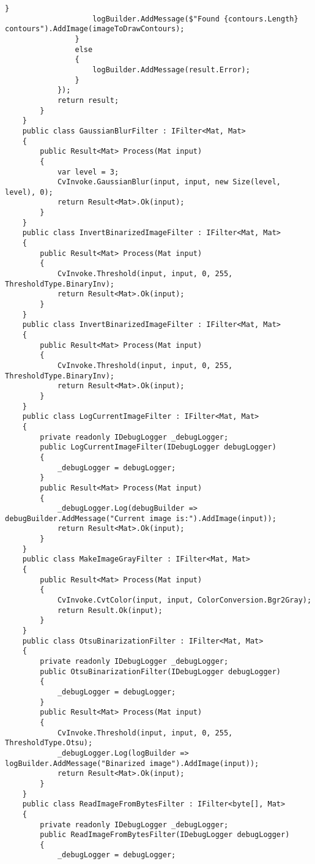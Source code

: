 \begin{lstlisting}[style=fsharpstyle,caption={Исходный код}, label=lst:recognition_result_handler]
                    }
                    logBuilder.AddMessage($"Found {contours.Length} contours").AddImage(imageToDrawContours);
                }
                else
                {
                    logBuilder.AddMessage(result.Error);
                }
            });
            return result;
        }
    }
    public class GaussianBlurFilter : IFilter<Mat, Mat>
    {
        public Result<Mat> Process(Mat input)
        {
            var level = 3;
            CvInvoke.GaussianBlur(input, input, new Size(level, level), 0);
            return Result<Mat>.Ok(input);
        }
    }
    public class InvertBinarizedImageFilter : IFilter<Mat, Mat>
    {
        public Result<Mat> Process(Mat input)
        {
            CvInvoke.Threshold(input, input, 0, 255, ThresholdType.BinaryInv);
            return Result<Mat>.Ok(input);
        }
    }
    public class InvertBinarizedImageFilter : IFilter<Mat, Mat>
    {
        public Result<Mat> Process(Mat input)
        {
            CvInvoke.Threshold(input, input, 0, 255, ThresholdType.BinaryInv);
            return Result<Mat>.Ok(input);
        }
    }
    public class LogCurrentImageFilter : IFilter<Mat, Mat>
    {
        private readonly IDebugLogger _debugLogger;
        public LogCurrentImageFilter(IDebugLogger debugLogger)
        {
            _debugLogger = debugLogger;
        }
        public Result<Mat> Process(Mat input)
        {
            _debugLogger.Log(debugBuilder => debugBuilder.AddMessage("Current image is:").AddImage(input));
            return Result<Mat>.Ok(input);
        }
    }
    public class MakeImageGrayFilter : IFilter<Mat, Mat>
    {
        public Result<Mat> Process(Mat input)
        {
            CvInvoke.CvtColor(input, input, ColorConversion.Bgr2Gray);
            return Result.Ok(input);
        }
    }
    public class OtsuBinarizationFilter : IFilter<Mat, Mat>
    {
        private readonly IDebugLogger _debugLogger;
        public OtsuBinarizationFilter(IDebugLogger debugLogger)
        {
            _debugLogger = debugLogger;
        }
        public Result<Mat> Process(Mat input)
        {
            CvInvoke.Threshold(input, input, 0, 255, ThresholdType.Otsu);
            _debugLogger.Log(logBuilder => logBuilder.AddMessage("Binarized image").AddImage(input));
            return Result<Mat>.Ok(input);
        }
    }
    public class ReadImageFromBytesFilter : IFilter<byte[], Mat>
    {
        private readonly IDebugLogger _debugLogger;
        public ReadImageFromBytesFilter(IDebugLogger debugLogger)
        {
            _debugLogger = debugLogger;

\end{lstlisting}

